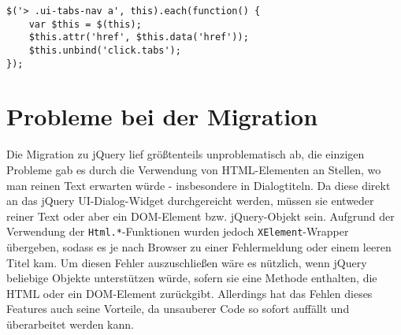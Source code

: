 \begin{lstlisting}[label=lst:static-tabs,caption=Umwandlung der Tabs in reguläre Links]
$('> .ui-tabs-nav a', this).each(function() {
    var $this = $(this);
    $this.attr('href', $this.data('href'));
    $this.unbind('click.tabs');
});
\end{lstlisting}


\section{Probleme bei der Migration}

Die Migration zu jQuery lief größtenteils unproblematisch ab, die einzigen Probleme gab es durch die
Verwendung von HTML-Elementen an Stellen, wo man reinen Text erwarten würde - insbesondere in
Dialogtiteln. Da diese direkt an das jQuery UI-Dialog-Widget durchgereicht werden, müssen sie
entweder reiner Text oder aber ein DOM-Element bzw. jQuery-Objekt sein. Aufgrund der Verwendung der
\lstinline{Html.*}-Funktionen wurden jedoch \lstinline{XElement}-Wrapper übergeben, sodass es je
nach Browser zu einer Fehlermeldung oder einem leeren Titel kam. Um diesen Fehler auszuschließen
wäre es nützlich, wenn jQuery beliebige Objekte unterstützen würde, sofern sie eine Methode
enthalten, die HTML oder ein DOM-Element zurückgibt. Allerdings hat das Fehlen dieses Features auch
seine Vorteile, da unsauberer Code so sofort auffällt und überarbeitet werden kann.
